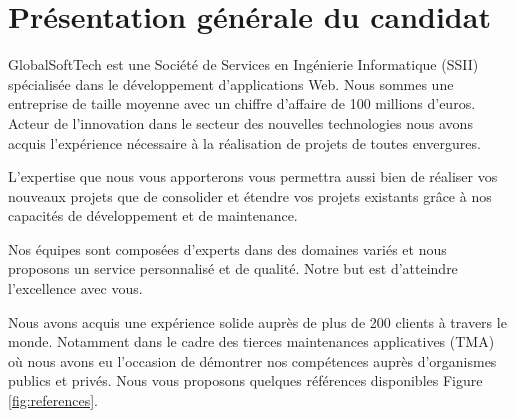 \chapter{Présentation générale du candidat}
	GlobalSoftTech est une Société de Services en Ingénierie Informatique (SSII) spécialisée dans le développement d’applications Web. Nous sommes une entreprise de taille moyenne avec un chiffre d’affaire de 100 millions d’euros. Acteur de l’innovation dans le secteur des nouvelles technologies nous avons acquis l’expérience nécessaire à la réalisation de projets de toutes envergures. 
	
	L'expertise que nous vous apporterons vous permettra aussi bien de réaliser vos nouveaux projets que de consolider et étendre vos projets existants grâce à nos capacités de développement et de maintenance.
	
	Nos équipes sont composées d’experts dans des domaines variés et nous proposons un service personnalisé et de qualité. Notre but est d’atteindre l’excellence avec vous. 
	
	Nous avons acquis une expérience solide auprès de plus de 200 clients à travers le monde. Notamment dans le cadre des tierces maintenances applicatives (TMA) où nous avons eu l’occasion de démontrer nos compétences auprès d’organismes publics et privés. Nous vous proposons quelques références disponibles Figure \ref{fig:references}.
	
